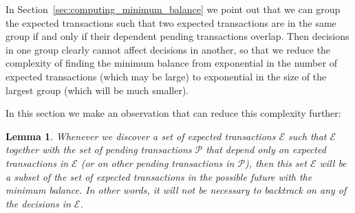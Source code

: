 \documentclass{article}
\newtheorem{lemma}{Lemma}[section] %
\numberwithin{equation}{lemma}
\begin{document}
In Section~\ref{sec:computing_minimum_balance} we point out that we can group
the expected transactions such that two expected transactions are in the same
group if and only if their dependent pending transactions overlap. Then
decisions in one group clearly cannot affect decisions in another, so that we
reduce the complexity of finding the minimum balance from exponential in the
number of expected transactions (which may be large) to exponential in the size
of the largest group (which will be much smaller).

In this section we make an observation that can reduce this complexity further:

\begin{lemma}
Whenever we discover a set of expected transactions $\mathcal{E}$ such that
$\mathcal{E}$ together with the set of pending transactions $\mathcal{P}$ that
depend \emph{only} on expected transactions in $\mathcal{E}$ (or on other
pending transactions in $\mathcal{P}$), then this set $\mathcal{E}$ will be a
subset of the set of expected transactions in the possible future with the
minimum balance. In other words, it will not be necessary to backtrack on any of
the decisions in $\mathcal{E}$.
\end{lemma}
\end{document}
